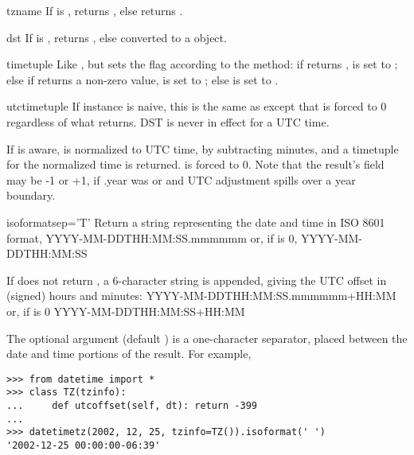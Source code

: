 \begin{methoddesc}{tzname}{}
    If  is , returns , else
    returns .
\end{methoddesc}

\begin{methoddesc}{dst}{}
    If  is , returns , else
     converted to a 
    object.
\end{methoddesc}

\begin{methoddesc}{timetuple}{}
    Like , but sets the
     flag according to the  method:  if
     returns ,  is set to
    ; else if  returns a non-zero value,
     is set to ; else  is set
    to .
\end{methoddesc}

\begin{methoddesc}{utctimetuple}{}
    If  instance  is naive, this is the same as
     except that  is forced to 0
    regardless of what  returns.  DST is never in effect
    for a UTC time.

    If  is aware,  is normalized to UTC time, by subtracting
     minutes, and a timetuple for the
    normalized time is returned.   is forced to 0.
    Note that the result's  field may be
    -1 or +1, if .year was
     or  and UTC adjustment spills over a
    year boundary.
\end{methoddesc}

\begin{methoddesc}{isoformat}{sep='T'}
    Return a string representing the date and time in ISO 8601 format,
        YYYY-MM-DDTHH:MM:SS.mmmmmm
    or, if  is 0,
        YYYY-MM-DDTHH:MM:SS

    If  does not return , a 6-character
    string is appended, giving the UTC offset in (signed) hours and
    minutes:
        YYYY-MM-DDTHH:MM:SS.mmmmmm+HH:MM
    or, if  is 0
        YYYY-MM-DDTHH:MM:SS+HH:MM

    The optional argument  (default ) is a
    one-character separator, placed between the date and time portions
    of the result.  For example,

\begin{verbatim}
>>> from datetime import *
>>> class TZ(tzinfo):
...     def utcoffset(self, dt): return -399
...
>>> datetimetz(2002, 12, 25, tzinfo=TZ()).isoformat(' ')
'2002-12-25 00:00:00-06:39'
\end{verbatim}
\end{methoddesc}

